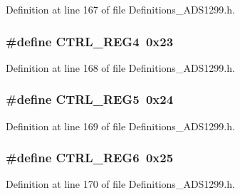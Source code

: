 Definition at line 167 of file Definitions\+\_\+\+A\+D\+S1299.\+h.

\subsubsection[{\texorpdfstring{C\+T\+R\+L\+\_\+\+R\+E\+G4}{CTRL_REG4}}]{\setlength{\rightskip}{0pt plus 5cm}\#define C\+T\+R\+L\+\_\+\+R\+E\+G4~0x23}\hypertarget{group__Definitions__ADS1299_ga36c532b0a660c101907dcad7ee399fbd}{}\label{group__Definitions__ADS1299_ga36c532b0a660c101907dcad7ee399fbd}


Definition at line 168 of file Definitions\+\_\+\+A\+D\+S1299.\+h.

\subsubsection[{\texorpdfstring{C\+T\+R\+L\+\_\+\+R\+E\+G5}{CTRL_REG5}}]{\setlength{\rightskip}{0pt plus 5cm}\#define C\+T\+R\+L\+\_\+\+R\+E\+G5~0x24}\hypertarget{group__Definitions__ADS1299_ga97cbbf0a1e80e40544629e925e5a9026}{}\label{group__Definitions__ADS1299_ga97cbbf0a1e80e40544629e925e5a9026}


Definition at line 169 of file Definitions\+\_\+\+A\+D\+S1299.\+h.

\subsubsection[{\texorpdfstring{C\+T\+R\+L\+\_\+\+R\+E\+G6}{CTRL_REG6}}]{\setlength{\rightskip}{0pt plus 5cm}\#define C\+T\+R\+L\+\_\+\+R\+E\+G6~0x25}\hypertarget{group__Definitions__ADS1299_gaa23de000c06ad03c55eea4ef3062279d}{}\label{group__Definitions__ADS1299_gaa23de000c06ad03c55eea4ef3062279d}


Definition at line 170 of file Definitions\+\_\+\+A\+D\+S1299.\+h.

